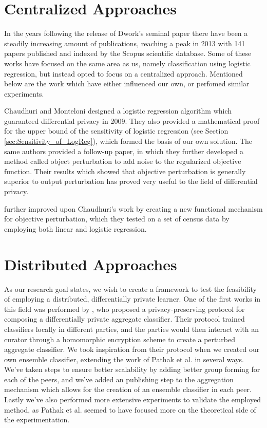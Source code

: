 \section{Centralized Approaches}
In the years following the release of Dwork's seminal paper there have been a steadily increasing amount of publications, reaching a peak in 2013 with 141 papers published and indexed by the Scopus scientific database. Some of these works have focused on the same area as us, namely classification using logistic regression, but instead opted to focus on a centralized approach. Mentioned below are the work which have either influenced our own, or perfomed similar experiments. 


Chaudhuri and Monteloni designed a logistic regression algorithm which guaranteed differential privacy in 2009. They also provided a mathematical proof for the upper bound of the sensitivity of logistic regression (see Section \ref{sec:Sensitivity_of_LogReg}), which formed the basis of our own solution. The same authors provided a follow-up paper\citep{chaudhuri2011riskMinimization}, in which they further developed a method called object perturbation to add noise to the regularized objective function. Their results which showed that objective perturbation is generally superior to output perturbation has proved very useful to the field of differential privacy. 

\cite{zhang2012functionMechanism} further improved upon Chaudhuri's work by creating a new functional mechanism for objective perturbation, which they tested on a set of census data by employing both linear and logistic regression. 

\section{Distributed Approaches}
As our research goal states, we wish to create a framework to test the feasibility of employing a distributed, differentially private learner. One of the first works in this field was performed by  \cite{pathak2010diffprivhomo}, who proposed a privacy-preserving protocol for composing a differentially private aggregate classifier. Their protocol trained classifiers locally in different parties, and the parties would then interact with an curator through a homomorphic encryption scheme to create a perturbed aggregate classifier. We took inspiration from their protocol when we created our own ensemble classifier, extending the work of Pathak et al. in several ways. We've taken steps to ensure better scalability by adding better group forming for each of the peers, and we've added an publishing step to the aggregation mechanism which allows for the creation of an ensemble classifier in each peer. Lastly we've also performed more extensive experiments to validate the employed method, as Pathak et al. seemed to have focused more on the theoretical side of the experimentation. 

